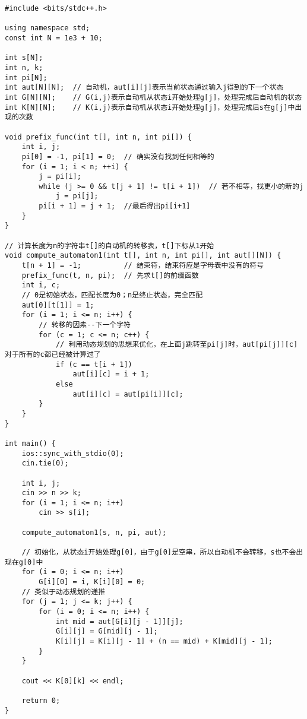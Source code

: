         \begin{lstlisting}
#include <bits/stdc++.h>

using namespace std;
const int N = 1e3 + 10;

int s[N];
int n, k;
int pi[N];
int aut[N][N];  // 自动机，aut[i][j]表示当前状态通过输入j得到的下一个状态
int G[N][N];    // G(i,j)表示自动机从状态i开始处理g[j]，处理完成后自动机的状态
int K[N][N];    // K(i,j)表示自动机从状态i开始处理g[j]，处理完成后s在g[j]中出现的次数

void prefix_func(int t[], int n, int pi[]) {
    int i, j;
    pi[0] = -1, pi[1] = 0;  // 确实没有找到任何相等的
    for (i = 1; i < n; ++i) {
        j = pi[i];
        while (j >= 0 && t[j + 1] != t[i + 1])  // 若不相等，找更小的新的j
            j = pi[j];
        pi[i + 1] = j + 1;  //最后得出pi[i+1]
    }
}

// 计算长度为n的字符串t[]的自动机的转移表，t[]下标从1开始
void compute_automaton1(int t[], int n, int pi[], int aut[][N]) {
    t[n + 1] = -1;          // 结束符，结束符应是字母表中没有的符号
    prefix_func(t, n, pi);  // 先求t[]的前缀函数
    int i, c;
    // 0是初始状态，匹配长度为0；n是终止状态，完全匹配
    aut[0][t[1]] = 1;
    for (i = 1; i <= n; i++) {
        // 转移的因素--下一个字符
        for (c = 1; c <= n; c++) {
            // 利用动态规划的思想来优化，在上面j跳转至pi[j]时，aut[pi[j]][c]对于所有的c都已经被计算过了
            if (c == t[i + 1])
                aut[i][c] = i + 1;
            else
                aut[i][c] = aut[pi[i]][c];
        }
    }
}

int main() {
    ios::sync_with_stdio(0);
    cin.tie(0);

    int i, j;
    cin >> n >> k;
    for (i = 1; i <= n; i++)
        cin >> s[i];

    compute_automaton1(s, n, pi, aut);

    // 初始化，从状态i开始处理g[0]，由于g[0]是空串，所以自动机不会转移，s也不会出现在g[0]中
    for (i = 0; i <= n; i++)
        G[i][0] = i, K[i][0] = 0;
    // 类似于动态规划的递推
    for (j = 1; j <= k; j++) {
        for (i = 0; i <= n; i++) {
            int mid = aut[G[i][j - 1]][j];
            G[i][j] = G[mid][j - 1];
            K[i][j] = K[i][j - 1] + (n == mid) + K[mid][j - 1];
        }
    }

    cout << K[0][k] << endl;

    return 0;
}
        \end{lstlisting}
